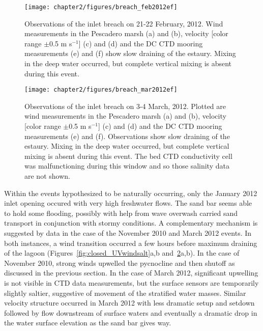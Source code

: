 \begin{figure}[tbh]
	\centering
	\texttt{[image: chapter2/figures/breach\_feb2012ef]} 
	\caption{Observations of the inlet breach on 21-22 February, 2012. Wind measurements in the Pescadero marsh (a) and (b), velocity [color range $\pm$0.5 m s$^{-1}$] (c) and (d) and the DC CTD mooring measurements (e) and (f) show slow draining of the estaury. Mixing in the deep water occurred, but complete vertical mixing is absent during this event.} \label{fig:breach_feb2012}
\end{figure}


\begin{figure}[tbh]
	\centering
	\texttt{[image: chapter2/figures/breach\_mar2012ef]} 
	\caption{Observations of the inlet breach on 3-4 March, 2012. Plotted are wind measurements in the Pescadero marsh (a) and (b), velocity [color range $\pm$0.5 m s$^{-1}$] (c) and (d) and the DC CTD mooring measurements (e) and (f). Observations show slow draining of the estaury. Mixing in the deep water occurred, but complete vertical mixing is absent during this event. The bed CTD conductivity cell was malfunctioning during this window and so those salinity data are not shown.} \label{fig:breach_mar2012}
\end{figure}


Within the events hypothesized to be naturally occurring, only the January 2012 inlet opening occured with very high freshwater flows. The sand bar seems able to hold some flooding, possibly with help from wave overwash carried sand transport in conjunction with stormy conditions.  A complementary mechanism is suggested by data in the case of the November 2010 and March 2012 events. In both instances, a wind transition occurred a few hours before maximum draining of the lagoon (Figures~\ref{fig:closed_UVwindsalt}a,b and~\ref{fig:breach_mar2012}a,b). In the case of November 2010, strong winds upwelled the pycnocline and then shutoff as discussed in the previous section. In the case of March 2012, significant upwelling is not visible in CTD data measurements, but the surface sensors are temporarily slightly saltier, suggestive of movement of the stratified water masses. Similar velocity structure occurred in March 2012 with less dramatic setup and setdown followed by flow downstream of surface waters and eventually a dramatic drop in the water surface elevation as the sand bar gives way. 

